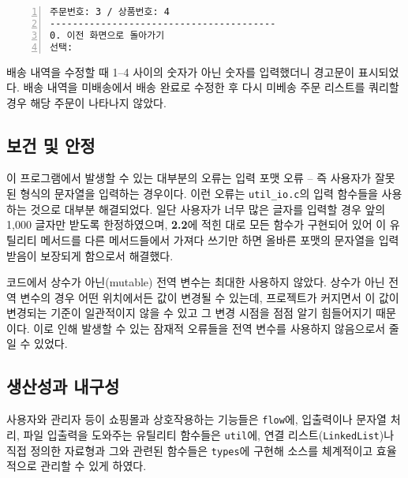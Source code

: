 \documentclass[runningheads]{llncs}
\begin{document}
\begin{Verbatim}[frame=single,numbers=left,commandchars=\\\{\}]
주문번호: 3 / 상품번호: 4
----------------------------------------
0. 이전 화면으로 돌아가기
선택: 
\end{Verbatim}

배송 내역을 수정할 때 1--4 사이의 숫자가 아닌 숫자를 입력했더니 경고문이 표시되었다. 배송 내역을 미배송에서 배송 완료로 수정한 후 다시 미베송 주문 리스트를 쿼리할 경우 해당 주문이 나타나지 않았다.

\subsection{보건 및 안정}
이 프로그램에서 발생할 수 있는 대부분의 오류는 입력 포맷 오류 -- 즉 사용자가 잘못된 형식의 문자열을 입력하는 경우이다. 이런 오류는 \texttt{util_io.c}의 입력 함수들을 사용하는 것으로 대부분 해결되었다. 일단 사용자가 너무 많은 글자를 입력할 경우 앞의 1,000 글자만 받도록 한정하였으며, \textbf{2.2}에 적힌 대로 모든 함수가 구현되어 있어 이 유틸리티 메서드를 다른 메서드들에서 가져다 쓰기만 하면 올바른 포맷의 문자열을 입력받음이 보장되게 함으로서 해결했다.

코드에서 상수가 아닌(mutable) 전역 변수는 최대한 사용하지 않았다. 상수가 아닌 전역 변수의 경우 어떤 위치에서든 값이 변경될 수 있는데, 프로젝트가 커지면서 이 값이 변경되는 기준이 일관적이지 않을 수 있고 그 변경 시점을 점점 알기 힘들어지기 때문이다. 이로 인해 발생할 수 있는 잠재적 오류들을 전역 변수를 사용하지 않음으로서 줄일 수 있었다.

\subsection{생산성과 내구성}
사용자와 관리자 등이 쇼핑몰과 상호작용하는 기능들은 \texttt{flow}에, 입출력이나 문자열 처리, 파일 입출력을 도와주는 유틸리티 함수들은 \texttt{util}에, 연결 리스트(\texttt{LinkedList})나 직접 정의한 자료형과 그와 관련된 함수들은 \texttt{types}에 구현해 소스를 체계적이고 효율적으로 관리할 수 있게 하였다.
\end{document}

